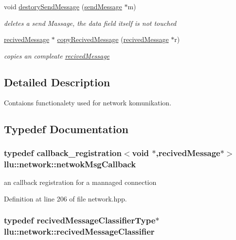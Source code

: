 \begin{DoxyCompactItemize}
void \hyperlink{namespacellu_1_1network_a8c61905bb65d88aa69349ee7138577a8}{destory\+Send\+Message} (\hyperlink{structllu_1_1network_1_1send_message}{send\+Message} $\ast$m)
\begin{DoxyCompactList}\small\item\em deletes a send Massage, the data field itself is not touched \end{DoxyCompactList}\item 
\hyperlink{structllu_1_1network_1_1recived_message}{recived\+Message} $\ast$ \hyperlink{namespacellu_1_1network_a126aeba4f63e2f7d5617ee4568b32895}{copy\+Recived\+Message} (\hyperlink{structllu_1_1network_1_1recived_message}{recived\+Message} $\ast$r)
\begin{DoxyCompactList}\small\item\em copies an compleate \hyperlink{structllu_1_1network_1_1recived_message}{recived\+Message} \end{DoxyCompactList}\end{DoxyCompactItemize}


\subsection{Detailed Description}
Contaions functionalety used for network komunikation. 

\subsection{Typedef Documentation}
\hypertarget{namespacellu_1_1network_a999d34263abe84a87d12271383c606b9}{
\subsubsection[{netwok\+Msg\+Callback}]{\setlength{\rightskip}{0pt plus 5cm}typedef {\bf callback\+\_\+registration}$<$void $\ast$,{\bf recived\+Message}$\ast$$>$ {\bf llu\+::network\+::netwok\+Msg\+Callback}}}\label{namespacellu_1_1network_a999d34263abe84a87d12271383c606b9}


an callback registration for a mannaged connection 



Definition at line 206 of file network.\+hpp.

\hypertarget{namespacellu_1_1network_ac629c1180a0bee8ddef541f73cb3e5f9}{
\subsubsection[{recived\+Message\+Classifier}]{\setlength{\rightskip}{0pt plus 5cm}typedef {\bf recived\+Message\+Classifier\+Type}$\ast$ {\bf llu\+::network\+::recived\+Message\+Classifier}}}\label{namespacellu_1_1network_ac629c1180a0bee8ddef541f73cb3e5f9}


